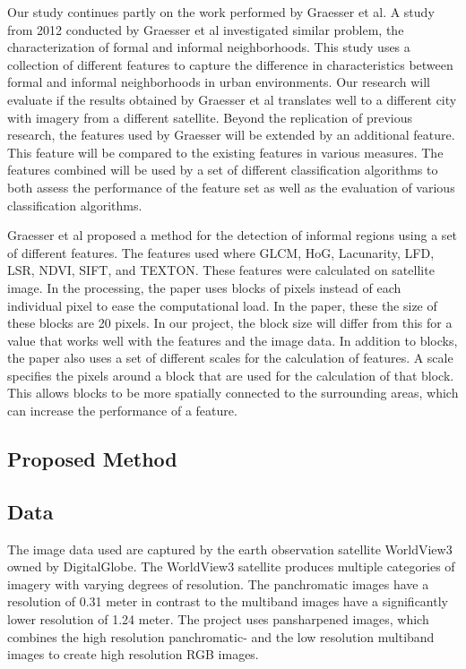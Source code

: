 Our study continues partly on the work performed by Graesser et al.  A study
from 2012 conducted by Graesser et al  investigated similar
problem, the characterization of formal and informal neighborhoods.  This study
uses a collection of different features to capture the difference in
characteristics between formal and informal neighborhoods in urban
environments. Our research will evaluate if the results obtained by Graesser et
al translates well to a different city with imagery from a different
satellite. Beyond the replication of previous research, the features used by
Graesser will be extended by an additional feature. This feature will be
compared to the existing features in various measures. The features combined
will be used by a set of different classification algorithms to both assess the
performance of the feature set as well as the evaluation of various
classification algorithms.



Graesser et al proposed a method for the detection of informal regions using
a set of different features. The features used where GLCM, HoG, Lacunarity,
LFD, LSR, NDVI, SIFT, and TEXTON. These features were calculated on satellite
image. In the processing, the paper uses blocks of pixels instead of each
individual pixel to ease the computational load. In the paper, these the size
of these blocks are 20 pixels. In our project, the block size will differ from
this for a value that works well with the features and the image data.
In addition to blocks, the paper also uses a set of different scales for the
calculation of features. A scale specifies the pixels around a block that
are used for the calculation of that block. This allows blocks to be more
spatially connected to the surrounding areas, which can increase the
performance of a feature. 


\subsection{Proposed Method}


\subsection{Data}

The image data used are captured by the earth observation satellite WorldView3
owned by DigitalGlobe. The WorldView3 satellite produces multiple categories of
imagery with varying degrees of resolution. The panchromatic images have
a resolution of 0.31 meter in contrast to  the multiband images have
a significantly lower resolution of
1.24 meter. The project uses pansharpened images, which combines the high
resolution panchromatic- and the low resolution multiband images to create
high resolution RGB images.

